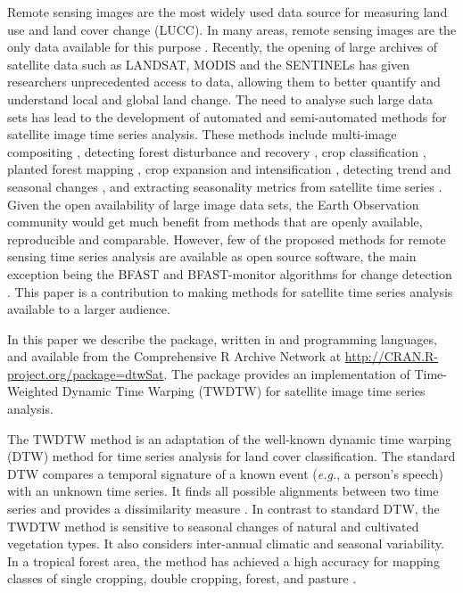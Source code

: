 \documentclass[article,shortnames]{jss}
\begin{document}
Remote sensing images are the most widely used data source for measuring
land use and land cover change (LUCC). In many areas, remote sensing
images are the only data available for this purpose
\citep{Lambin:2006, Fritz:2013}. Recently, the opening of large archives
of satellite data such as LANDSAT, MODIS and the SENTINELs has given
researchers unprecedented access to data, allowing them to better
quantify and understand local and global land change. The need to
analyse such large data sets has lead to the development of automated
and semi-automated methods for satellite image time series analysis.
These methods include multi-image compositing \citep{Griffiths:2013},
detecting forest disturbance and recovery
\citep{Kennedy:2010, Zhu:2012, DeVries:2015}, crop classification
\citep{Xiao:2005, Wardlow:2007, Petitjean:2012, Maus:2016}, planted
forest mapping \citep{Maire:2014}, crop expansion and intensification
\citep{Galford:2008, Sakamoto:2009}, detecting trend and seasonal
changes
\citep{Lunetta:2006, Verbesselt:2010, Verbesselt:2010a, Verbesselt:2012},
and extracting seasonality metrics from satellite time series
\citep{Jonsson:2002, Jonsson:2004}. Given the open availability of large
image data sets, the Earth Observation community would get much benefit
from methods that are openly available, reproducible and comparable.
However, few of the proposed methods for remote sensing time series
analysis are available as open source software, the main exception being
the BFAST and BFAST-monitor algorithms for change detection
\citep{Verbesselt:2010, Verbesselt:2010a}. This paper is a contribution
to making methods for satellite time series analysis available to a
larger audience.

In this paper we describe the  package, written in
 \citep{R:2015} and  programming
languages, and available from the Comprehensive R Archive Network at
\url{http://CRAN.R-project.org/package=dtwSat}. The package provides an
implementation of Time-Weighted Dynamic Time Warping (TWDTW)
\citep{Maus:2016} for satellite image time series analysis.

The TWDTW method is an adaptation of the well-known dynamic time warping
(DTW) method for time series analysis
\citep{Velichko:1970, Sakoe:1971, Sakoe:1978, Rabiner:1993, Berndt:1994, Keogh:2005, Muller:2007}
for land cover classification. The standard DTW compares a temporal
signature of a known event (\emph{e.g.}, a person's speech) with an
unknown time series. It finds all possible alignments between two time
series and provides a dissimilarity measure \citep{Rabiner:1993}. In
contrast to standard DTW, the TWDTW method is sensitive to seasonal
changes of natural and cultivated vegetation types. It also considers
inter-annual climatic and seasonal variability. In a tropical forest
area, the method has achieved a high accuracy for mapping classes of
single cropping, double cropping, forest, and pasture \citep{Maus:2016}.
\end{document}
